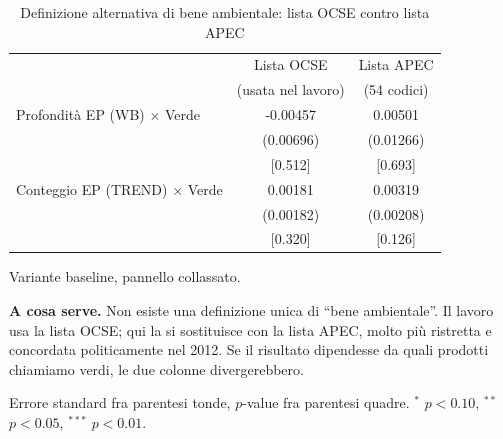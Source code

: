 \begin{table}[htbp]
\centering
\footnotesize
\caption{Definizione alternativa di bene ambientale: lista OCSE contro lista APEC}
\label{tab:apec}
\begin{threeparttable}
\begin{tabular}{lcc}
\toprule
 & Lista OCSE & Lista APEC \\
 & (usata nel lavoro) & (54 codici) \\
\midrule
Profondit\`a EP (WB) $\times$ Verde & -0.00457 & 0.00501 \\
 & (0.00696) & (0.01266) \\
 & [0.512] & [0.693] \\
\addlinespace
Conteggio EP (TREND) $\times$ Verde & 0.00181 & 0.00319 \\
 & (0.00182) & (0.00208) \\
 & [0.320] & [0.126] \\
\bottomrule
\end{tabular}
\begin{tablenotes}[flushleft]\footnotesize
\item Variante baseline, pannello collassato.
\item \textbf{A cosa serve.} Non esiste una definizione unica di ``bene ambientale''. Il lavoro usa la lista OCSE; qui la si sostituisce con la lista APEC, molto pi\`u ristretta e concordata politicamente nel 2012. Se il risultato dipendesse da quali prodotti chiamiamo verdi, le due colonne divergerebbero.
\item Errore standard fra parentesi tonde, $p$-value fra parentesi quadre. $^{*}$ $p<0.10$, $^{**}$ $p<0.05$, $^{***}$ $p<0.01$.
\end{tablenotes}
\end{threeparttable}
\end{table}
